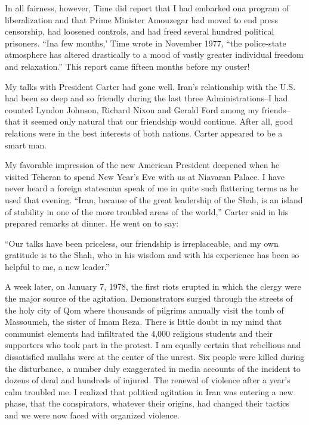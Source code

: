 In all fairness, however, Time did report that I had embarked ona program of liberalization and that Prime Minister Amouzegar had moved to end press censorship, had loosened controls, and had freed several hundred political prisoners. “Ina few months,’ Time wrote in November 1977, “the police-state atmosphere has altered drastically to a mood of vastly greater individual freedom and relaxation.” This report came fifteen months before my ouster! 

My talks with President Carter had gone well. Iran's relationship with the U.S. had been so deep and so friendly during the last three Administrations--I had counted Lyndon Johnson, Richard Nixon and Gerald Ford among my friends--that it seemed only natural that our friendship would continue. After all, good relations were in the best interests of both nations. Carter appeared to be a smart man. 

My favorable impression of the new American President deepened when he visited Teheran to spend New Year's Eve with us at Niavaran Palace. I have never heard a foreign statesman speak of me in quite such flattering terms as he used that evening. “Iran, because of the great leadership of the Shah, is an island of stability in one of the more troubled areas of the world,” Carter said in his prepared remarks at dinner. He went on to say: 


“Our talks have been priceless, our friendship is irreplaceable, and my own gratitude is to the Shah, who in his wisdom and with his experience has been so helpful to me, a new leader.” 


A week later, on January 7, 1978, the first riots erupted in which the clergy were the major source of the agitation. Demonstrators surged through the streets of the holy city of Qom where thousands of pilgrims annually visit the tomb of Massoumeh, the sister of Imam Reza. There is little doubt in my mind that communist elements had infiltrated the 4,000 religious students and their supporters who took part in the protest. I am equally certain that rebellious and dissatisfied mullahs were at the center of the unrest. Six people were killed during the disturbance, a number duly exaggerated in media accounts of the incident to dozens of dead and hundreds of injured. The renewal of violence after a year’s calm troubled me. I realized that political agitation in Iran was entering a new phase, that the conspirators, whatever their origins, had changed their tactics and we were now faced with organized violence. 

